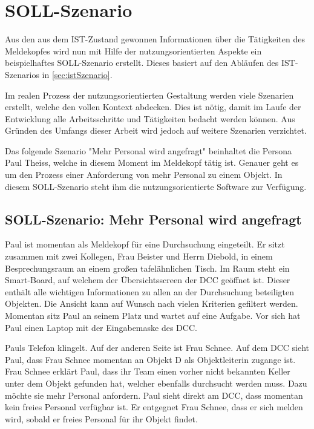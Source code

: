 \section{SOLL-Szenario}\label{sec:sollSzenario}

Aus den aus dem IST-Zustand gewonnen Informationen über die Tätigkeiten des Meldekopfes wird nun mit Hilfe der nutzungsorientierten Aspekte ein beispielhaftes SOLL-Szenario erstellt.
Dieses basiert auf den Abläufen des IST-Szenarios in \autoref{sec:istSzenario}.

Im realen Prozess der nutzungsorientierten Gestaltung werden viele Szenarien erstellt, welche den vollen Kontext abdecken.
Dies ist nötig, damit im Laufe der Entwicklung alle Arbeitsschritte und Tätigkeiten bedacht werden können.
Aus Gründen des Umfangs dieser Arbeit wird jedoch auf weitere Szenarien verzichtet.

Das folgende Szenario "Mehr Personal wird angefragt" beinhaltet die Persona Paul Theiss, welche in diesem Moment im Meldekopf tätig ist.
Genauer geht es um den Prozess einer Anforderung von mehr Personal zu einem Objekt.
In diesem SOLL-Szenario steht ihm die nutzungsorientierte Software zur Verfügung.

\subsection{SOLL-Szenario: Mehr Personal wird angefragt}

Paul ist momentan als Meldekopf für eine Durchsuchung eingeteilt. 
Er sitzt zusammen mit zwei Kollegen, Frau Beister und Herrn Diebold, in einem Besprechungsraum an einem großen tafelähnlichen Tisch. 
Im Raum steht ein Smart-Board, auf welchem der Übersichtsscreen der DCC geöffnet ist. 
Dieser enthält alle wichtigen Informationen zu allen an der Durchsuchung beteiligten Objekten. 
Die Ansicht kann auf Wunsch nach vielen Kriterien gefiltert werden. 
Momentan sitz Paul an seinem Platz und wartet auf eine Aufgabe. 
Vor sich hat Paul einen Laptop mit der Eingabemaske des DCC.

Pauls Telefon klingelt. 
Auf der anderen Seite ist Frau Schnee. 
Auf dem DCC sieht Paul, dass Frau Schnee momentan an Objekt D als Objektleiterin zugange ist. 
Frau Schnee erklärt Paul, dass ihr Team einen vorher nicht bekannten Keller unter dem Objekt gefunden hat, welcher ebenfalls durchsucht werden muss. 
Dazu möchte sie mehr Personal anfordern. 
Paul sieht direkt am DCC, dass momentan kein freies Personal verfügbar ist. 
Er entgegnet Frau Schnee, dass er sich melden wird, sobald er freies Personal für ihr Objekt findet. 

